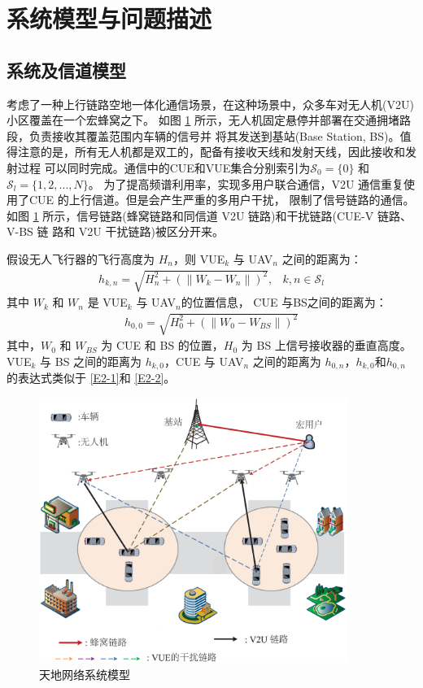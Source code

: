 \section{系统模型与问题描述}\label{section2-2}
\subsection{系统及信道模型}\label{section2-2-1}
考虑了一种上行链路空地一体化通信场景，在这种场景中，众多车对无人机(V2U)小区覆盖在一个宏蜂窝之下。
如图 \ref{天地网络系统模型} 所示，无人机固定悬停并部署在交通拥堵路段，负责接收其覆盖范围内车辆的信号并
将其发送到基站(Base Station, BS)。值得注意的是，所有无人机都是双工的，配备有接收天线和发射天线，因此接收和发射过程
可以同时完成。通信中的CUE和VUE集合分别索引为$\mathcal{S}_0= \{0\}$ 和$\mathcal{S}_l=\{1, 2,..., N\}$。
为了提高频谱利用率，实现多用户联合通信，V2U 通信重复使用了CUE 的上行信道。但是会产生严重的多用户干扰，
限制了信号链路的通信。如图 \ref{天地网络系统模型} 所示，信号链路(蜂窝链路和同信道 V2U 链路)和干扰链路(CUE-V 链路、V-BS 链
路和 V2U 干扰链路)被区分开来。

假设无人飞行器的飞行高度为 $H_n$，则 VUE$_{k}$ 与 UAV$_{n}$ 之间的距离为：
\begin{eqnarray}\label{E2-1}
h_{k,n}=\sqrt{H_n^2+(\|W_k-W_n\|)^2},           &k, n\in \mathcal{S}_l
\end{eqnarray}
其中 $W_k$ 和 $W_n$ 是 VUE$_{k}$ 与 UAV$_{n}$的位置信息，  CUE 与BS之间的距离为：
\begin{eqnarray}\label{E2-2}
h_{0,0}=\sqrt{H_0^2+(\|W_0-W_{BS}\|)^2}
\end{eqnarray}
其中，$W_0$ 和 $W_{BS}$ 为 CUE 和 BS 的位置，$H_0$ 为 BS 上信号接收器的垂直高度。VUE$_{k}$ 与 BS 之间的距离为 $h_{k,0}$，CUE 与 UAV$_{n}$ 之间的距离为 $h_{0,n}$，$h_{k,0}$和$h_{0,n}$的表达式类似于 \eqref{E2-1}和 \eqref{E2-2}。

\begin{figure}[H]
\centering
\includegraphics[width=10cm]{figures//chap2//第二章系统模型.eps}
\caption{天地网络系统模型}
\label{天地网络系统模型}
\end{figure}

